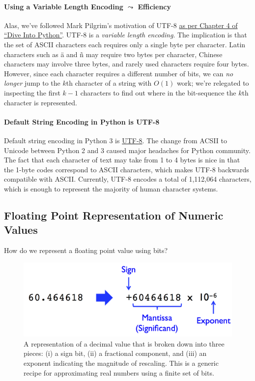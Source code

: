\documentclass[12pt,letterpaper,twoside]{article}
\begin{document}
\paragraph{Using a Variable Length Encoding $\leadsto$ Efficiency}
Alas, we've followed Mark Pilgrim's motivation of UTF-8
\href{http://histo.ucsf.edu/BMS270/diveintopython3-r802.pdf}
{as per Chapter 4 of ``Dive Into Python''}. UTF-8 is a \emph{variable length encoding}.
The implication is that the set of ASCII characters each
requires only a single byte per character. Latin characters such as
{\"a} and {\~n} may require two bytes per character, Chinese
characters may involve three bytes, and rarely used characters require
four bytes. However, since each character requires a different
number of bits, we can \emph{no longer} jump to the $k$th character of a string with
$O(1)$ work; we're relegated to inspecting the first $k-1$ characters
to find out where in the bit-sequence the $k$th character is represented.

\paragraph{Default String Encoding in Python is UTF-8}
Default string encoding in Python 3 is
\href{https://en.wikipedia.org/wiki/UTF-8}{UTF-8}.
The change from ACSII to Unicode between Python 2 and 3 caused major
headaches for Python community.
The fact that each character of text may take from
1 to 4 bytes is nice in that the 1-byte codes
correspond to ASCII characters, which makes UTF-8 backwards
compatible with ASCII. Currently,
UTF-8 encodes a total of 1,112,064 characters, which is enough to represent
the majority of human character systems.

\subsection{Floating Point Representation of Numeric Values}
How do we represent a floating point value using bits?

\begin{figure}[h]
\centering
\includegraphics[scale=0.45]{fig/float.png}
\caption{\footnotesize A representation of a decimal value that is broken down into
  three pieces: (i) a sign bit, (ii) a fractional component, and (iii)
  an exponent indicating the magnitude of rescaling. This is a generic
  recipe for approximating real numbers using a finite set of bits.}
\end{figure}
\end{document}
